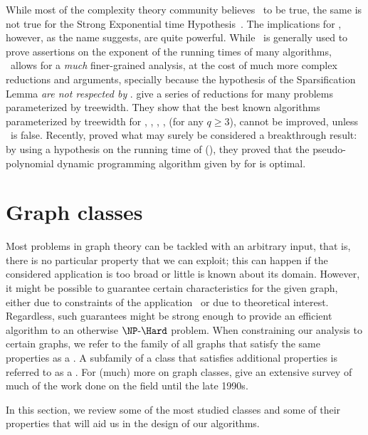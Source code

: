While most of the complexity theory community believes \ETH\ to be true, the same is not true for the Strong Exponential time Hypothesis~\citep{bad_seth}.
The implications for \SETH, however, as the name suggests, are quite powerful.
While \ETH\ is generally used to prove assertions on the exponent of the running times of many algorithms, \SETH\ allows for a \textit{much} finer-grained analysis, at the cost of much more complex reductions and arguments, specially because the hypothesis of the Sparsification Lemma \textit{are not respected by }.
\cite{seth_lokshtanov} give a series of reductions for many problems parameterized by treewidth.
They show that the best known algorithms parameterized by treewidth for , , , ,  (for any $q \geq 3$),  cannot be improved, unless \SETH\ is false.
Recently, \cite{seth_subset_sum} proved what may surely be considered a breakthrough result: by using a hypothesis on the running time of  (\SETH), they proved that the pseudo-polynomial dynamic programming algorithm given by \cite{bellman_dp} for  is optimal.


\section{Graph classes}
\label{sec:graph_classes}

Most problems in graph theory can be tackled with an arbitrary input, that is, there is no particular property that we can exploit; this can happen if the considered application is too broad or little is known about its domain.
However, it might be possible to guarantee certain characteristics for the given graph, either due to constraints of the application~\citep{fernando_chordal} or due to theoretical interest.
Regardless, such guarantees might be strong enough to provide an efficient algorithm to an otherwise $\NPH$ problem.
When constraining our analysis to certain graphs, we refer to the family of all graphs that satisfy the same properties as a .
A subfamily of a class that satisfies additional properties is referred to as a .
For (much) more on graph classes, \cite{classes_survey} give an extensive survey of much of the work done on the field until the late 1990s.

In this section, we review some of the most studied classes and some of their properties that will aid us in the design of our algorithms.

